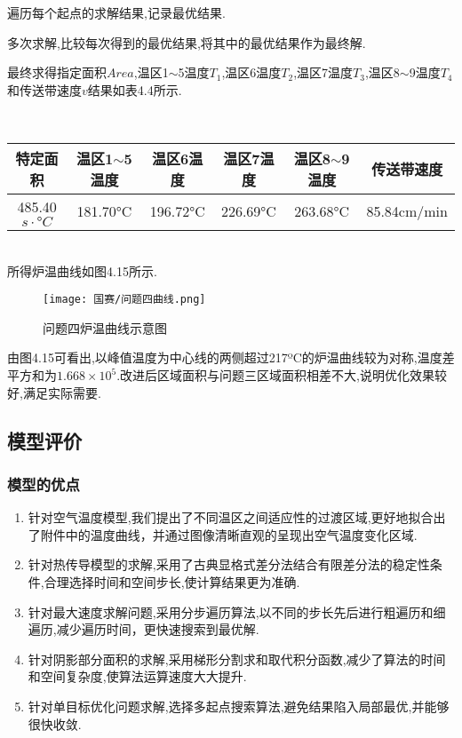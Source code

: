 \documentclass[12pt]{ctexart}
\numberwithin{figure}{section}
\numberwithin{table}{section}
\begin{document}
遍历每个起点的求解结果,记录最优结果.

多次求解,比较每次得到的最优结果,将其中的最优结果作为最终解.

最终求得指定面积$Area$,温区1$\sim$5温度$T_1$,温区6温度$T_2$,温区7温度$T_3$,温区8$\sim$9温度$T_4$和传送带速度$v$结果如表4.4所示.
\begin{longtable}
\centering
\setlength{\abovecaptionskip}{0pt}
\caption{问题四所求结果数据表}
\label{}\\
\begin{tabular}{c|c|c|c|c|c}
\hline
特定面积&温区1$\sim$5温度&温区6温度&温区7温度&温区8$\sim$9温度&传送带速度\\
\hline
485.40$s\cdot°C$&181.70°C&196.72°C&226.69°C&263.68°C&85.84cm/min\\
\hline
    \end{tabular}
    \end{longtable}\\
   
    所得炉温曲线如图4.15所示.
    
    \begin{figure}[!htp]
    \centering
    \setlength{\belowcaptionskip}{0pt}
    \texttt{[image: 国赛/问题四曲线.png]}
    \caption{问题四炉温曲线示意图}
    \label{tab:图1}
\end{figure}

由图4.15可看出,以峰值温度为中心线的两侧超过217ºC的炉温曲线较为对称,温度差平方和为$1.668\times10^5$.改进后区域面积与问题三区域面积相差不大,说明优化效果较好,满足实际需要.
\newpage
\subsection{模型评价}
\subsubsection{模型的优点}
\begin{enumerate}
    \item 针对空气温度模型,我们提出了不同温区之间适应性的过渡区域,更好地拟合出了附件中的温度曲线，并通过图像清晰直观的呈现出空气温度变化区域.
    \item 针对热传导模型的求解,采用了古典显格式差分法结合有限差分法的稳定性条件,合理选择时间和空间步长,使计算结果更为准确.
    \item 针对最大速度求解问题,采用分步遍历算法,以不同的步长先后进行粗遍历和细遍历,减少遍历时间，更快速搜索到最优解.
    \item 针对阴影部分面积的求解,采用梯形分割求和取代积分函数,减少了算法的时间和空间复杂度,使算法运算速度大大提升.
    \item 针对单目标优化问题求解,选择多起点搜索算法,避免结果陷入局部最优,并能够很快收敛.
\end{enumerate}
\end{document}
